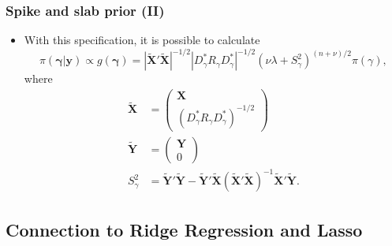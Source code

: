\documentclass[xcolor=table,10pt]{beamer}
\begin{document}
\begin{frame}
  \frametitle{Spike and slab prior (II)}
  \begin{itemize}
\item With this specification, it is possible to calculate
 \begin{equation}
   \label{eq:5}
   \pi(\bm\gamma|\bm y) \propto g(\bm\gamma) = \left|\tilde
     {\bm X}'\tilde {\bm X}\right|^{-1/2} \left|D_\gamma^\ast R_\gamma
     D_\gamma^\ast\right|^{-1/2} (\nu \lambda +
   S_\gamma^2)^{(n+\nu)/2} \pi(\gamma),
 \end{equation}
 where
 \begin{align*}
   \tilde {\bm X} &=
                    \begin{pmatrix}
                      \bm X\\
                      (D_\gamma^\ast R_\gamma D_\gamma^\ast)^{-1/2}
                    \end{pmatrix}\\[5pt]
   \tilde{\bm Y} &=
                   \begin{pmatrix}
                     \bm Y\\
                     0
                   \end{pmatrix}\\[5pt]
   S_\gamma^2 &= \tilde{\bm Y}' \tilde{\bm Y} - \tilde{\bm Y}'
                \tilde{\bm X} ( \tilde {\bm X}' \tilde{\bm X})^{-1}
                \tilde{\bm X}' \tilde{\bm Y}. 
 \end{align*}
\end{itemize}
\end{frame}

\subsection{Connection to Ridge Regression and Lasso}
\end{document}
